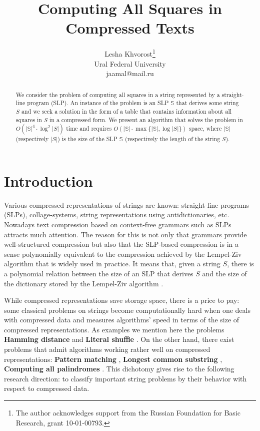 ﻿\documentclass[11pt]{article}
\newcommand{\slp}[1]{\mathbb{#1}}
\begin{document}
\title{Computing All Squares in Compressed Texts}
\author{Lesha Khvorost\thanks{The author acknowledges support from the Russian Foundation for Basic Research, grant
10-01-00793.}\\
Ural Federal University\\
jaamal@mail.ru}
\date{}
\maketitle

\begin{abstract}
We consider the problem of computing all squares in a string represented by a straight-line program (SLP). An
instance of the problem is an SLP $\slp{S}$ that derives some string $S$ and we seek a solution in the form of a table
that contains information about all squares in $S$ in a compressed form. We present an algorithm that solves the
problem in $O(|\slp{S}|^4\cdot \log^2{|S|})$ time and requires $O(|\slp{S}|\cdot \max\{ |\slp{S}|, \log{|S|}\})$ space,
where $|\slp{S}|$ (respectively $|S|$) is the size of the SLP $\slp{S}$ (respectively the length of the string $S$).
\end{abstract} 

\section{Introduction}

Various compressed representations of strings are known: straight-line programs (SLPs), collage-systems, string
representations using antidictionaries, etc. Nowadays text compression based on context-free grammars such as
SLPs attracts much attention. The reason for this is not only that grammars provide well-structured compression but
also that the SLP-based compression is in a sense polynomially equivalent to the compression achieved by the Lempel-Ziv
algorithm that is widely used in practice. It means that, given a string $S$, there is a polynomial relation between
the size of an SLP that derives $S$ and the size of the dictionary stored by the Lempel-Ziv algorithm \cite{18}.

While compressed representations save storage space, there is a price to pay: some classical problems on strings
become computationally hard when one deals with compressed data and measures algorithms' speed in terms of the
size of compressed representations. As examples we mention here the problems \textbf{Hamming distance} \cite{15} and
\textbf{Literal shuffle} \cite{4}. On the other hand, there exist problems that admit algorithms working rather well on
compressed representations: \textbf{Pattern matching} \cite{15}, \textbf{Longest common substring} \cite{16}, 
\textbf{Computing all palindromes} \cite{16}. This dichotomy gives rise to the following research direction: to
classify important string problems by their behavior with respect to compressed data.
\end{document}
